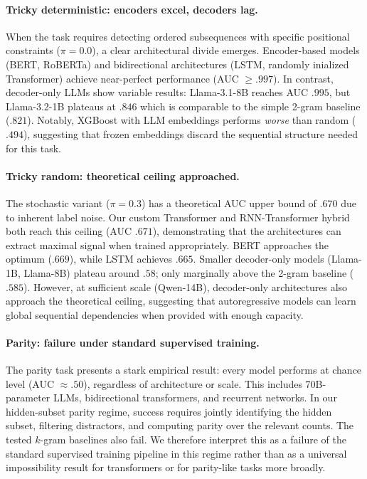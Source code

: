 \documentclass{article}
\theoremstyle{plain}
\theoremstyle{definition}
\theoremstyle{remark}
\begin{document}
\paragraph{Tricky deterministic: encoders excel, decoders lag.}
When the task requires detecting ordered subsequences with specific positional constraints ($\pi=0.0$), a clear architectural divide emerges. Encoder-based models (BERT, RoBERTa) and bidirectional architectures (LSTM, randomly inialized Transformer) achieve near-perfect performance (AUC $\geq .997$). In contrast, decoder-only LLMs show variable results: Llama-3.1-8B reaches AUC $.995$, but Llama-3.2-1B plateaus at $.846$ which is comparable to the simple 2-gram baseline ($.821$). Notably, XGBoost with LLM embeddings performs \textit{worse} than random ($.494$), suggesting that frozen embeddings discard the sequential structure needed for this task.

\paragraph{Tricky random: theoretical ceiling approached.}
The stochastic variant ($\pi=0.3$) has a theoretical AUC upper bound of $.670$ due to inherent label noise. Our custom Transformer and RNN-Transformer hybrid both reach this ceiling (AUC $.671$), demonstrating that the architectures can extract maximal signal when trained appropriately. BERT approaches the optimum ($.669$), while LSTM achieves $.665$. Smaller decoder-only models (Llama-1B, Llama-8B) plateau around $.58$; only marginally above the 2-gram baseline ($.585$). However, at sufficient scale (Qwen-14B), decoder-only architectures also approach the theoretical ceiling, suggesting that autoregressive models can learn global sequential dependencies when provided with enough capacity.

\paragraph{Parity: failure under standard supervised training.}
The parity task presents a stark empirical result: every model performs at chance level (AUC $\approx .50$), regardless of architecture or scale. This
includes 70B-parameter LLMs, bidirectional transformers, and recurrent networks. In our hidden-subset parity regime, success requires jointly identifying the hidden subset, filtering distractors, and computing parity over the relevant counts. The tested $k$-gram baselines also fail. We therefore interpret this as a failure of the standard supervised training
pipeline in this regime rather than as a universal impossibility result for transformers or for parity-like tasks more broadly.
\end{document}
